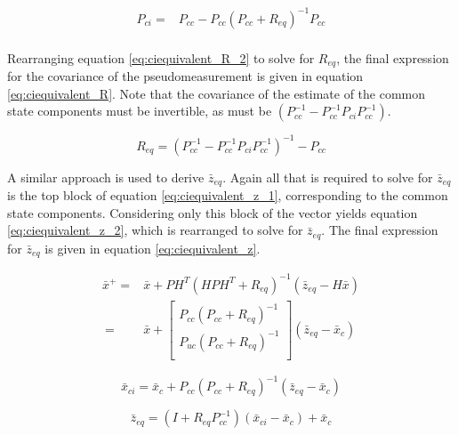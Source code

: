 \documentclass[journal]{IEEEtran}
\begin{document}
\begin{equation}
\begin{aligned}
    P_{ci} ={}& P_{cc} - P_{cc} (P_{cc} + R_{eq})^{-1} P_{cc} \\
\end{aligned} \label{eq:ciequivalent_R_2}
\end{equation}

Rearranging equation \ref{eq:ciequivalent_R_2} to solve for $R_{eq}$, the final expression for the covariance of the pseudomeasurement is given in equation \ref{eq:ciequivalent_R}. Note that the covariance of the estimate of the common state components must be invertible, as must be $(P_{cc}^{-1} - P_{cc}^{-1} P_{ci} P_{cc}^{-1})$.

\begin{equation}
    R_{eq} = (P_{cc}^{-1} - P_{cc}^{-1} P_{ci} P_{cc}^{-1})^{-1} - P_{cc}
\label{eq:ciequivalent_R}
\end{equation}

A similar approach is used to derive $\bar{z}_{eq}$. Again all that is required to solve for $\bar{z}_{eq}$ is the top block of equation \ref{eq:ciequivalent_z_1}, corresponding to the common state components. Considering only this block of the vector yields equation \ref{eq:ciequivalent_z_2}, which is rearranged to solve for $\bar{z}_{eq}$. The final expression for $\bar{z}_{eq}$ is given in equation \ref{eq:ciequivalent_z}.

\begin{equation}
\begin{aligned}
    \bar{x}^{+} ={}& \bar{x} + P H^{T} (H P H^{T} + R_{eq})^{-1} (\bar{z}_{eq} - H \bar{x}) \\
    \ ={}& \bar{x} + \begin{bmatrix}
            P_{cc}(P_{cc} + R_{eq})^{-1} \\
            P_{uc}(P_{cc} + R_{eq})^{-1} \\
        \end{bmatrix} (\bar{z}_{eq} - \bar{x}_{c})
\end{aligned} \label{eq:ciequivalent_z_1}
\end{equation}

\begin{equation}
    \bar{x}_{ci} = \bar{x}_{c} + P_{cc}(P_{cc} + R_{eq})^{-1} (\bar{z}_{eq} - \bar{x}_{c})
\label{eq:ciequivalent_z_2}
\end{equation}

\begin{equation}
    \bar{z}_{eq} = (I + R_{eq} P_{cc}^{-1}) (\bar{x}_{ci} - \bar{x}_{c}) + \bar{x}_{c}
\label{eq:ciequivalent_z}
\end{equation}
\end{document}
